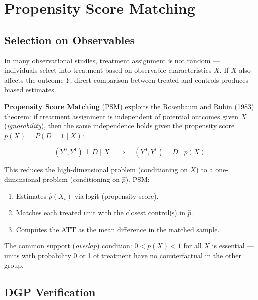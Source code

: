 \chapter{Propensity Score Matching}
\label{cap:psm}

\section{Selection on Observables}

In many observational studies, treatment assignment is not random
— individuals select into treatment based on observable characteristics
$X$. If $X$ also affects the outcome $Y$, direct comparison between
treated and controls produces biased estimates.

\textbf{Propensity Score Matching} (PSM) exploits the Rosenbaum and
Rubin (1983) theorem: if treatment assignment is independent of potential
outcomes given $X$ (\emph{ignorability}), then the same independence holds
given the propensity score $p(X) = P(D=1 \mid X)$:

\[
  (Y^0, Y^1) \perp D \mid X
  \quad\Longrightarrow\quad
  (Y^0, Y^1) \perp D \mid p(X)
\]

This reduces the high-dimensional problem (conditioning on $X$) to a
one-dimensional problem (conditioning on $\hat{p}$). PSM:
\begin{enumerate}
  \item Estimates $\hat{p}(X_i)$ via logit (propensity score).
  \item Matches each treated unit with the closest control(s) in $\hat{p}$.
  \item Computes the ATT as the mean difference in the matched sample.
\end{enumerate}

The common support (\emph{overlap}) condition: $0 < p(X) < 1$ for all $X$
is essential — units with probability 0 or 1 of treatment have no counterfactual
in the other group.

\section{DGP Verification}

